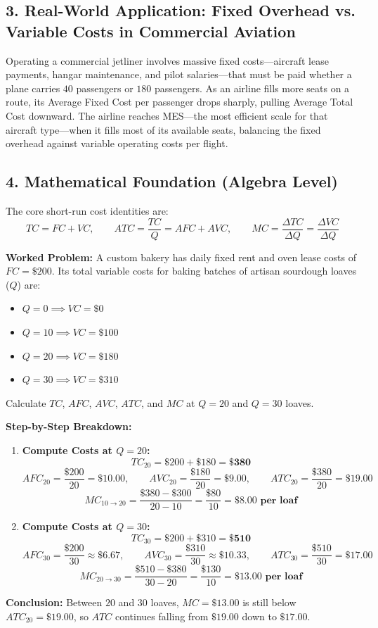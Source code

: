 \documentclass[11pt,letterpaper]{article}
\begin{document}
\subsection*{3. Real-World Application: Fixed Overhead vs. Variable Costs in Commercial Aviation}
Operating a commercial jetliner involves massive fixed costs—aircraft lease payments, hangar maintenance, and pilot salaries—that must be paid whether a plane carries $40$ passengers or $180$ passengers. As an airline fills more seats on a route, its Average Fixed Cost per passenger drops sharply, pulling Average Total Cost downward. The airline reaches MES—the most efficient scale for that aircraft type—when it fills most of its available seats, balancing the fixed overhead against variable operating costs per flight.

\subsection*{4. Mathematical Foundation (Algebra Level)}
The core short-run cost identities are:
\begin{equation}
TC = FC + VC, \qquad ATC = \frac{TC}{Q} = AFC + AVC, \qquad MC = \frac{\Delta TC}{\Delta Q} = \frac{\Delta VC}{\Delta Q}
\end{equation}

\noindent\textbf{Worked Problem:}
A custom bakery has daily fixed rent and oven lease costs of $FC = \$200$. Its total variable costs for baking batches of artisan sourdough loaves ($Q$) are:
\begin{itemize}
    \item $Q = 0 \implies VC = \$0$
    \item $Q = 10 \implies VC = \$100$
    \item $Q = 20 \implies VC = \$180$
    \item $Q = 30 \implies VC = \$310$
\end{itemize}
Calculate $TC$, $AFC$, $AVC$, $ATC$, and $MC$ at $Q = 20$ and $Q = 30$ loaves.

\noindent\textbf{Step-by-Step Breakdown:}
\begin{enumerate}
    \item \textbf{Compute Costs at $Q = 20$:}
    \[
    TC_{20} = \$200 + \$180 = \mathbf{\$380}
    \]
    \[
    AFC_{20} = \frac{\$200}{20} = \mathbf{\$10.00}, \qquad AVC_{20} = \frac{\$180}{20} = \mathbf{\$9.00}, \qquad ATC_{20} = \frac{\$380}{20} = \mathbf{\$19.00}
    \]
    \[
    MC_{10 \to 20} = \frac{\$380 - \$300}{20 - 10} = \frac{\$80}{10} = \mathbf{\$8.00\text{ per loaf}}
    \]

    \item \textbf{Compute Costs at $Q = 30$:}
    \[
    TC_{30} = \$200 + \$310 = \mathbf{\$510}
    \]
    \[
    AFC_{30} = \frac{\$200}{30} \approx \mathbf{\$6.67}, \qquad AVC_{30} = \frac{\$310}{30} \approx \mathbf{\$10.33}, \qquad ATC_{30} = \frac{\$510}{30} = \mathbf{\$17.00}
    \]
    \[
    MC_{20 \to 30} = \frac{\$510 - \$380}{30 - 20} = \frac{\$130}{10} = \mathbf{\$13.00\text{ per loaf}}
    \]
\end{enumerate}
\textbf{Conclusion:} Between $20$ and $30$ loaves, $MC = \$13.00$ is still below $ATC_{20} = \$19.00$, so $ATC$ continues falling from $\$19.00$ down to $\$17.00$.
\end{document}
